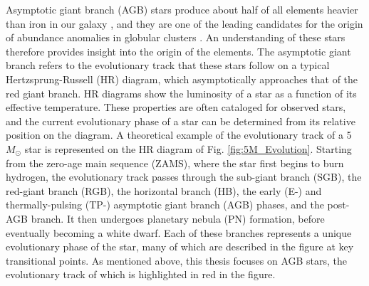 Asymptotic giant branch (AGB) stars produce about half of all elements heavier than iron in our galaxy \cite{Busso1999}, and they are one of the leading candidates for the origin of abundance anomalies in globular clusters \cite{Prantzos2007}. An understanding of these stars therefore provides insight into the origin of the elements. The asymptotic giant branch refers to the evolutionary track that these stars follow on a typical Hertzsprung-Russell (HR) diagram, which asymptotically approaches that of the red giant branch. HR diagrams show the luminosity of a star as a function of its effective temperature. These properties are often cataloged for observed stars, and the current evolutionary phase of a star can be determined from its relative position on the diagram. A theoretical example of the evolutionary track of a 5 $M_{\odot}$ star is represented on the HR diagram of Fig. \ref{fig:5M_Evolution}. Starting from the zero-age main sequence (ZAMS), where the star first begins to burn hydrogen, the evolutionary track passes through the sub-giant branch (SGB), the red-giant branch (RGB), the horizontal branch (HB), the early (E-) and thermally-pulsing (TP-) asymptotic giant branch (AGB) phases, and the post-AGB branch. It then undergoes planetary nebula (PN) formation, before eventually becoming a white dwarf. Each of these branches represents a unique evolutionary phase of the star, many of which are described in the figure at key transitional points. As mentioned above, this thesis focuses on AGB stars, the evolutionary track of which is highlighted in red in the figure.

